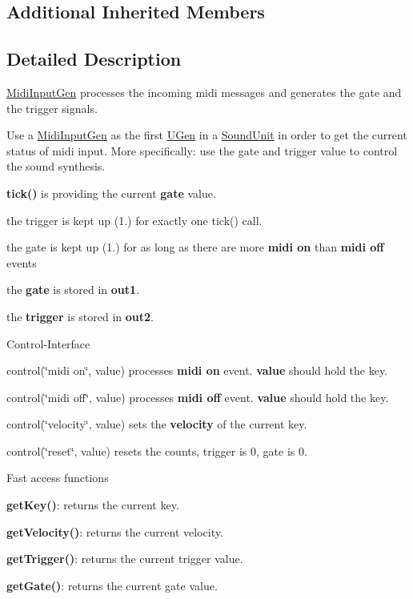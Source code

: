 \subsection*{Additional Inherited Members}


\subsection{Detailed Description}
\hyperlink{classunit_1_1MidiInputGen}{Midi\+Input\+Gen} processes the incoming midi messages and generates the gate and the trigger signals.

Use a \hyperlink{classunit_1_1MidiInputGen}{Midi\+Input\+Gen} as the first \hyperlink{classunit_1_1UGen}{U\+Gen} in a \hyperlink{classunit_1_1SoundUnit}{Sound\+Unit} in order to get the current status of midi input. More specifically\+: use the gate and trigger value to control the sound synthesis.


\begin{DoxyItemize}
\item {\bfseries tick()} is providing the current {\bfseries gate} value.
\item the trigger is kept up (1.) for exactly one tick() call.
\item the gate is kept up (1.) for as long as there are more {\bfseries midi on} than {\bfseries midi off} events
\item the {\bfseries gate} is stored in {\bfseries out1}.
\item the {\bfseries trigger} is stored in {\bfseries out2}.
\end{DoxyItemize}

Control-\/\+Interface


\begin{DoxyItemize}
\item control(\char`\"{}midi on\char`\"{}, value) processes {\bfseries midi on} event. {\bfseries value} should hold the key.
\item control(\char`\"{}midi off\char`\"{}, value) processes {\bfseries midi off} event. {\bfseries value} should hold the key.
\item control(\char`\"{}velocity\char`\"{}, value) sets the {\bfseries velocity} of the current key.
\item control(\char`\"{}reset\char`\"{}, value) resets the counts, trigger is 0, gate is 0.
\end{DoxyItemize}

Fast access functions


\begin{DoxyItemize}
\item {\bfseries get\+Key()}\+: returns the current key.
\item {\bfseries get\+Velocity()}\+: returns the current velocity.
\item {\bfseries get\+Trigger()}\+: returns the current trigger value.
\item {\bfseries get\+Gate()}\+: returns the current gate value.
\end{DoxyItemize}

